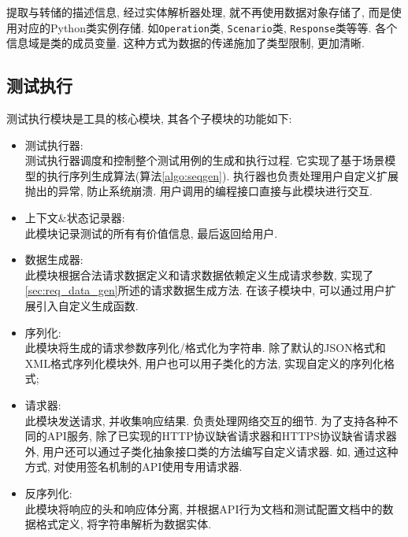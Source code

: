 	        提取与转储的描述信息, 经过实体解析器处理, 就不再使用数据对象存储了, 而是使用对应的Python类实例存储. 如\texttt{Operation}类, \texttt{Scenario}类, \texttt{Response}类等等. 各个信息域是类的成员变量. 这种方式为数据的传递施加了类型限制, 更加清晰.
	    
	    \subsection{测试执行}
	    
	        测试执行模块是工具的核心模块, 其各个子模块的功能如下:
	        
	        \begin{itemize}
	            \item 测试执行器:\\
    	            测试执行器调度和控制整个测试用例的生成和执行过程. 它实现了基于场景模型的执行序列生成算法(算法\ref{algo:seqgen}). 执行器也负责处理用户自定义扩展抛出的异常, 防止系统崩溃. 用户调用的编程接口直接与此模块进行交互.
    	            
	            \item 上下文\&状态记录器:\\
	                此模块记录测试的所有有价值信息, 最后返回给用户.
	                
	            \item 数据生成器:\\
	                此模块根据合法请求数据定义和请求数据依赖定义生成请求参数, 实现了\ref{sec:req_data_gen}所述的请求数据生成方法. 在该子模块中, 可以通过用户扩展引入自定义生成函数.
	                
	            \item 序列化:\\
	                此模块将生成的请求参数序列化/格式化为字符串. 除了默认的JSON格式和XML格式序列化模块外, 用户也可以用子类化的方法, 实现自定义的序列化格式;
	                
	            \item 请求器:\\
	                此模块发送请求, 并收集响应结果. 负责处理网络交互的细节. 为了支持各种不同的API服务, 除了已实现的HTTP协议缺省请求器和HTTPS协议缺省请求器外, 用户还可以通过子类化抽象接口类的方法编写自定义请求器. 如, 通过这种方式, 对使用签名机制的API使用专用请求器.
	                
	            \item 反序列化:\\
	                此模块将响应的头和响应体分离, 并根据API行为文档和测试配置文档中的数据格式定义, 将字符串解析为数据实体.
	                

\end{itemize}
